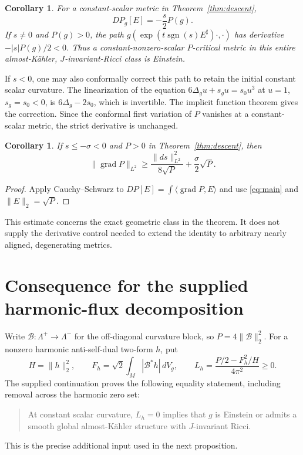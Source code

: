 \documentclass[11pt]{article}
\newcommand{\grad}{\operatorname{grad}}
\newcommand{\dd}{\,dV_g}
\newtheorem{corollary}[theorem]{Corollary}
\theoremstyle{remark}
\begin{document}
\begin{corollary}\label{cor:csc}
For a constant-scalar metric in Theorem~\ref{thm:descent},
\[
 DP_g[E]=-\frac{s}{2}P(g).
\]
If $s\ne0$ and $P(g)>0$, the path
$g(\exp(t\operatorname{sgn}(s)E^\sharp)\cdot,\cdot)$ has derivative
$-|s|P(g)/2<0$. Thus a constant-nonzero-scalar $P$-critical metric in
this entire almost-K\"ahler, $J$-invariant-Ricci class is Einstein.
\end{corollary}

If $s<0$, one may also conformally correct this path to retain the initial
constant scalar curvature. The linearization of the equation
$6\Delta_g u+s_gu=s_0u^3$ at $u=1$, $s_g=s_0<0$, is
$6\Delta_g-2s_0$, which is invertible. The implicit function theorem
gives the correction. Since the conformal first variation of $P$ vanishes
at a constant-scalar metric, the strict derivative is unchanged.

\begin{corollary}
If $s\le-\sigma<0$ and $P>0$ in Theorem~\ref{thm:descent}, then
\[
 \|\grad P\|_{L^2}
 \ge \frac{\|ds\|_{L^2}^2}{8\sqrt P}
       +\frac{\sigma}{2}\sqrt P.
\]
\end{corollary}
\begin{proof}
Apply Cauchy--Schwarz to $DP[E]=\int\langle\grad P,E\rangle$ and
use \eqref{eq:main} and $\|E\|_2=\sqrt P$.
\end{proof}
This estimate concerns the exact geometric class in the theorem.
It does not supply the derivative control needed to extend the identity
to arbitrary nearly aligned, degenerating metrics.

\section{Consequence for the supplied harmonic-flux decomposition}

Write $\mathcal B:\Lambda^+\to\Lambda^-$ for the off-diagonal curvature
block, so $P=4\|\mathcal B\|_2^2$. For a nonzero harmonic anti-self-dual
two-form $h$, put
\[
 H=\|h\|_2^2,\qquad F_h=\sqrt2\int_M|\mathcal B^*h|\dd,
 \qquad L_h=\frac{P/2-F_h^2/H}{4\pi^2}\ge0.
\]
The supplied continuation \cite[Sections 4--5]{Input} proves the following
equality statement, including removal across the harmonic zero set:
\begin{quote}
At constant scalar curvature, $L_h=0$ implies that $g$ is Einstein or
admits a smooth global almost-K\"ahler structure with $J$-invariant Ricci.
\end{quote}
This is the precise additional input used in the next proposition.
\end{document}
